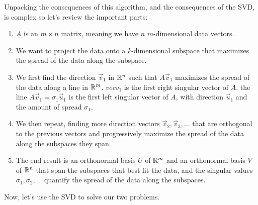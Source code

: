 \documentclass{ximera}
\begin{document}
\begin{remark}
  Unpacking the consequences of this algorithm, and the consequences of the SVD, is complex so let's review the important parts:
  \begin{enumerate}
    \item $A$ is an $m\times n$ matrix, meaning we have $n$ $m$-dimensional data vectors. 
    \item We want to project the data onto a $k$-dimensional subspace that maximizes the spread of the data along the subspace.
    \item We first find the direction $\vec{v}_1$ in $\mathbb{R}^n$ such that $A\vec{v}_1$ maximizes the spread of the data along a line in $\mathbb{R}^m$. $vec{v}_1$ is the first right singular vector of $A$, the line $A\vec{v}_1=\sigma_1\vec{u}_1$ is the first left singular vector of $A$, with direction $\vec{u}_1$ and the amount of spread $\sigma_1$.
    \item We then repeat, finding more direction vectors $\vec{v}_2,\vec{v}_3,\ldots$ that are orthogonal to the previous vectors and progressively maximize the spread of the data along the subspaces they span.
    \item The end result is an orthonormal basis $U$ of $\mathbb{R}^m$ and an orthonormal basis $V$ of $\mathbb{R}^n$ that span the subspaces that best fit the data, and the singular values $\sigma_1,\sigma_2,\ldots$ quantify the spread of the data along the subspaces.
  \end{enumerate}
\end{remark}

Now, let's use the SVD to solve our two problems.
\end{document}
